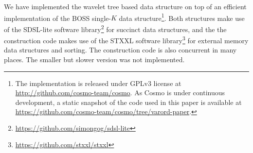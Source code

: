 \begin{table*}[!t]
\begin{tabularx}{\linewidth}{rd{3.2}d{4.9}d{3.2}d{4.9}d{3.2}d{5.9}d{3.2}d{5.9}}

\bottomrule
\end{tabularx}
\label{tab:nav-time}
\end{table*}

We have implemented the wavelet tree based data structure on top of an efficient implementation of the BOSS single-$K$ data structure\footnote{The
implementation is released under GPLv3 license at \url{http://github.com/cosmo-team/cosmo}. As Cosmo is under continuous development,
a static snapshot of the code used in this paper is available at \url{https://github.com/cosmo-team/cosmo/tree/varord-paper}.}.
Both structures make use of the SDSL-lite software library\footnote{\url{https://github.com/simongog/sdsl-lite}} for succinct data structures, and the
the construction code makes use of the STXXL software library\footnote{\url{https://github.com/stxxl/stxxl}} for external memory data structures and sorting.
The construction code is also concurrent in many places.%
The smaller but slower version was not implemented.

